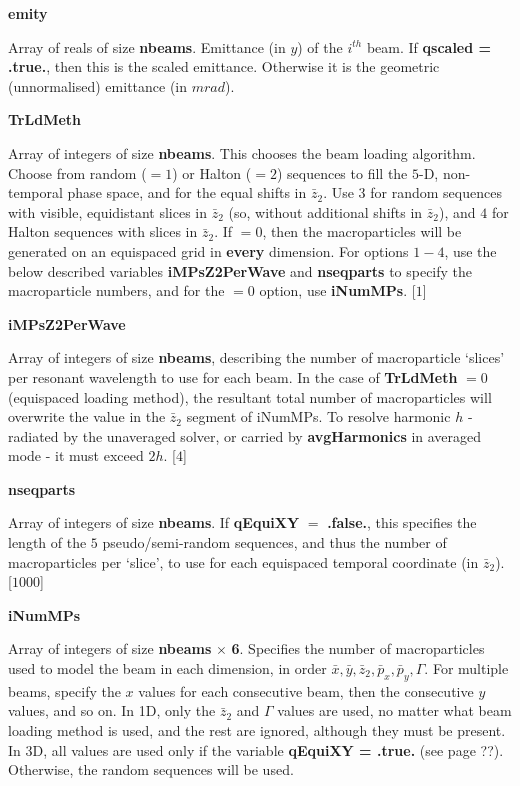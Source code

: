 \documentclass[12pt]{article}%
\begin{document}
{\bf emity}

Array of reals of size {\bf nbeams}. Emittance (in $y$) of the $i^{th}$ beam. If {\bf qscaled = .true.}, then this is the scaled emittance. Otherwise it is the geometric (unnormalised) emittance (in $m rad$).



{\bf TrLdMeth}

Array of integers of size {\bf nbeams}. This chooses the beam loading algorithm. Choose from random ($=1$) or Halton ($=2$) sequences to fill the $5$-D, non-temporal phase space, and for the equal shifts in $\bar{z}_2$. Use $3$ for random sequences with visible, equidistant slices in $\bar{z}_2$ (so, without additional shifts in $\bar{z}_2$), and $4$ for Halton sequences with slices in $\bar{z}_2$. If $=0$, then the macroparticles will be generated on an equispaced grid in {\bf every} dimension. For options $1-4$, use the below described variables {\bf iMPsZ2PerWave} and {\bf nseqparts} to specify the macroparticle numbers, and for the $=0$ option, use {\bf iNumMPs}. [$1$]


{\bf iMPsZ2PerWave}

Array of integers of size {\bf nbeams}, describing the number of macroparticle `slices' per resonant wavelength to use for each beam. In the case of {\bf TrLdMeth} $= 0$ (equispaced loading method), the resultant total number of macroparticles will overwrite the value in the $\bar{z}_2$ segment of iNumMPs. To resolve harmonic $h$ - radiated by the unaveraged solver, or carried by {\bf avgHarmonics} in averaged mode - it must exceed $2h$. [$4$]

{\bf nseqparts}

Array of integers of size {\bf nbeams}. If {\bf qEquiXY} $=$ {\bf .false.}, this specifies the length of the $5$ pseudo/semi-random sequences, and thus the number of macroparticles per `slice', to use for each equispaced temporal coordinate (in $\bar{z}_2$). [$1000$]

{\bf iNumMPs}

Array of integers of size {\bf nbeams} $\times$ {\bf 6}. Specifies the number of macroparticles used to model the beam in each dimension, in order $\bar{x}, \bar{y}, \bar{z}_2, \bar{p}_x, \bar{p}_y, \Gamma$. For multiple beams, specify the $x$ values for each consecutive beam, then the consecutive $y$ values, and so on. In 1D, only the $\bar{z}_2$ and $\Gamma$ values are used, no matter what beam loading method is used, and the rest are ignored, although they must be present. In 3D, all values are used only if the variable {\bf qEquiXY = .true.} (see page ??). Otherwise, the random sequences will be used.
\end{document}
